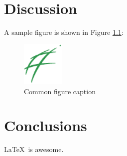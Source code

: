 \chapter{Discussion}

A sample figure is shown in Figure \ref{fig:sample_figure}:

\begin{figure}
	\centering
	\includegraphics[width=2cm]{logos/envsci-green}
	\caption{Common figure caption}
	\label{fig:sample_figure}
\end{figure}

\chapter{Conclusions}

\LaTeX\ is awesome.
